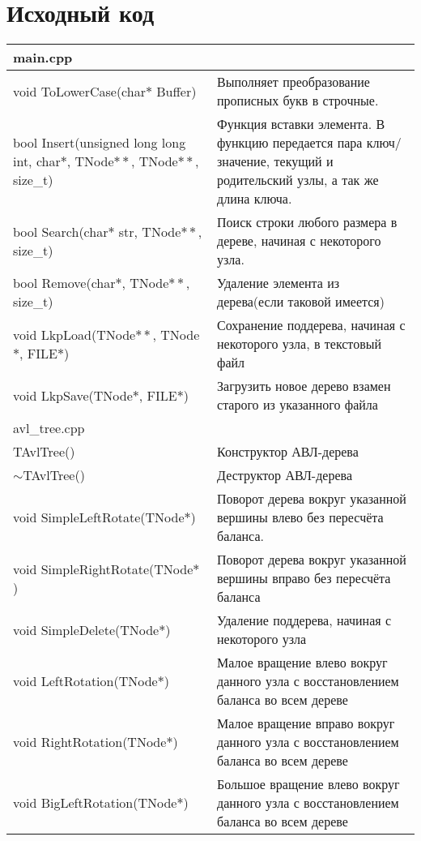 \section{Исходный код}
\begin{longtable}{|p{7.5cm}|p{7.5cm}|}
\hline
\hline
\rowcolor{lightgray}

\multicolumn{2}{|c|} {main.cpp}\\
\hline
void ToLowerCase(char$*$ Buffer)&Выполняет преобразование прописных букв в строчные.\\
\hline
bool Insert(unsigned long long int, char$\ast$, TNode$\ast\ast$, TNode$\ast\ast$, size\_t)&Функция вставки элемента. В функцию передается пара ключ/значение, текущий и родительский узлы, а так же длина ключа.\\
\hline
bool Search(char$\ast$ str, TNode$\ast\ast$, size\_t)&Поиск строки любого размера в дереве, начиная с некоторого узла.\\
\hline
bool Remove(char$\ast$, TNode$\ast\ast$, size\_t)&Удаление элемента из дерева(если таковой имеется)\\
\hline
void LkpLoad(TNode$\ast\ast$, TNode$\ast$, FILE$\ast$)&Сохранение поддерева, начиная с некоторого узла, в текстовый файл\\
\hline
void LkpSave(TNode$\ast$, FILE$\ast$)&Загрузить новое дерево взамен старого из указанного файла\\
\hline
\hline
\rowcolor{lightgray}
\multicolumn{2}{|c|} {avl\_tree.cpp}\\
\hline
TAvlTree()&Конструктор АВЛ-дерева\\
\hline
$\sim$TAvlTree()&Деструктор АВЛ-дерева\\
\hline
void SimpleLeftRotate(TNode$\ast$)&Поворот дерева вокруг указанной вершины влево без пересчёта баланса. \\
\hline
void SimpleRightRotate(TNode$\ast$)&Поворот дерева вокруг указанной вершины вправо без пересчёта баланса\\
\hline
void SimpleDelete(TNode$\ast$)&Удаление поддерева, начиная с некоторого узла\\
\hline
void LeftRotation(TNode$\ast$)&Малое вращение влево вокруг данного узла с восстановлением баланса во всем дереве \\
\hline 
void RightRotation(TNode$\ast$)&Малое вращение вправо вокруг данного узла с восстановлением баланса во всем дереве \\
\hline
void BigLeftRotation(TNode$\ast$)&Большое вращение влево вокруг данного узла с восстановлением баланса во всем дереве	\\

\end{longtable}
